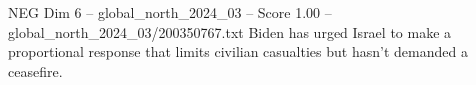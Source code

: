 \begin{textsample}{NEG Dim 6 – global\_north\_2024\_03 – Score 1.00 – global\_north\_2024\_03/200350767.txt}
Biden has urged Israel to make a proportional response that limits civilian casualties but hasn't demanded a ceasefire.

\end{textsample}
